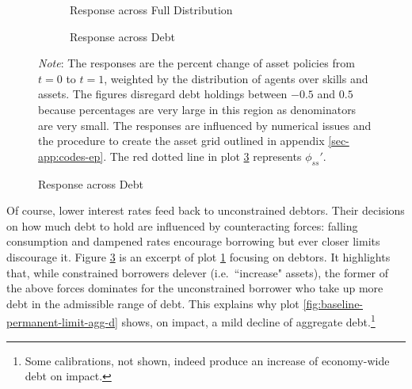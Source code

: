 \documentclass[a4paper,12pt]{article} %
\numberwithin{equation}{section} %
\numberwithin{figure}{section}
\numberwithin{table}{section}
\begin{document}
\begin{figure}[t]
    \caption{Baseline Model -- Shock to Borrowing Limit: \\ Asset Response across Asset Distribution}
    \label{fig:baseline-permanent-limit-dist-a-response}
    \centering
    \begin{subfigure}[b]{0.49\textwidth}
    \caption{Response across Full Distribution}
    \label{fig:baseline-permanent-limit-dist-a-response-all}
         \centering
         
     \end{subfigure}
     \hfill
     \begin{subfigure}[b]{0.49\textwidth}
     \caption{Response across Debt}
     \label{fig:baseline-permanent-limit-dist-a-response-debt}
         \centering
         
     \end{subfigure}

    \vspace{5pt}
     
     \justifying
     \footnotesize
	\textit{Note}: The responses are the percent change of asset policies from $t=0$ to $t=1$, weighted by the distribution of agents over skills and assets. The figures disregard debt holdings between $-0.5$ and $0.5$ because percentages are very large in this region as denominators are very small. The responses are influenced by numerical issues and the procedure to create the asset grid outlined in appendix \ref{sec-app:codes-ep}. The red dotted line in plot \ref{fig:baseline-permanent-limit-dist-a-response-debt} represents $\phi_{ss}'$.
\end{figure}

Of course, lower interest rates feed back to unconstrained debtors. Their decisions on how much debt to hold are influenced by counteracting forces: falling consumption and dampened rates encourage borrowing but ever closer limits discourage it. Figure \ref{fig:baseline-permanent-limit-dist-a-response-debt} is an excerpt of plot \ref{fig:baseline-permanent-limit-dist-a-response-all} focusing on debtors. It highlights that, while constrained borrowers delever (i.e.~``increase" assets), the former of the above forces dominates for the unconstrained borrower who take up more debt in the admissible range of debt. This explains why plot \ref{fig:baseline-permanent-limit-agg-d} shows, on impact, a mild decline of aggregate debt.\footnote{Some calibrations, not shown, indeed produce an increase of economy-wide debt on impact.}
\end{document}
